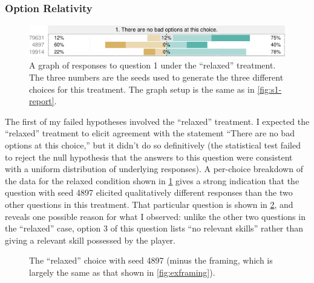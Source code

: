 \subsubsection{Option Relativity}


\begin{figure}[!h]
  \includegraphics[width=\textwidth]{fig/relaxed-q1.pdf}
  \caption[``No bad options'' prospective responses]{A graph of responses to question 1 under the ``relaxed'' treatment. The three numbers are the seeds used to generate the three different choices for this treatment. The graph setup is the same as in \cref{fig:s1-report}.}
  \label{fig:s1-relaxedq1}
\end{figure}


The first of my failed hypotheses involved the ``relaxed'' treatment.
%
I expected the ``relaxed'' treatment to elicit agreement with the statement ``There are no bad options at this choice,'' but it didn't do so definitively (the statistical test failed to reject the null hypothesis that the answers to this question were consistent with a uniform distribution of underlying responses).
%
A per-choice breakdown of the data for the relaxed condition shown in \cref{fig:s1-relaxedq1} gives a strong indication that the question with seed 4897 elicited qualitatively different responses than the two other questions in this treatment.
%
That particular question is shown in \cref{fig:s1-seed-4897}, and reveals one possible reason for what I observed: unlike the other two questions in the ``relaxed'' case, option 3 of this question lists ``no relevant skills'' rather than giving a relevant skill possessed by the player.


\begin{figure}[!h]
\centering
{}
\caption[``Relaxed'' choice 4897]{The ``relaxed'' choice with seed 4897 (minus the framing, which is largely the same as that shown in \cref{fig:exframing}).}
  \label{fig:s1-seed-4897}
\end{figure}


